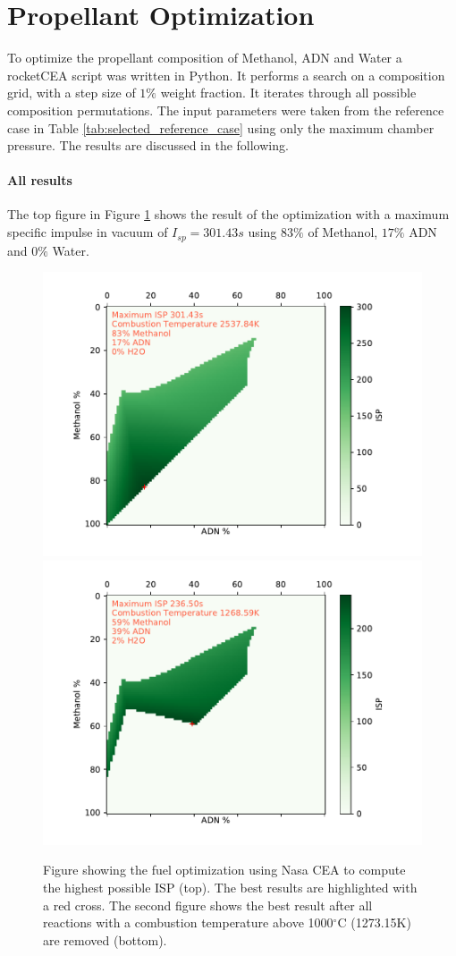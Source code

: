 \documentclass[12pt]{article}
\begin{document}
\section{Propellant Optimization}
To optimize the propellant composition of Methanol, ADN and Water a rocketCEA script was written in Python. It performs a search on a composition grid, with a step size of $1\%$ weight fraction. It iterates through all possible composition permutations. The input parameters were taken from the reference case in Table \ref{tab:selected_reference_case} using only the maximum chamber pressure. The results are discussed in the following.

\paragraph{All results}
The top figure in Figure \ref{fig:fuel_optimization_all_results} shows the result of the optimization with a maximum specific impulse in vacuum of $I_{sp}=301.43s$ using $83\%$ of Methanol, $17\%$ ADN and $0\%$ Water.

\begin{figure}[!h]
	\centering
	\includegraphics[width=0.8\linewidth]{figures/b3_1.pdf}
	\includegraphics[width=0.8\linewidth]{figures/b3_2.pdf}
	\caption{Figure showing the fuel optimization using Nasa CEA to compute the highest possible ISP (top). The best results are highlighted with a red cross. The second figure shows the best result after all reactions with a combustion temperature above 1000$^\circ$C (1273.15K) are removed (bottom).}
	\label{fig:fuel_optimization_all_results}
\end{figure}
\end{document}
